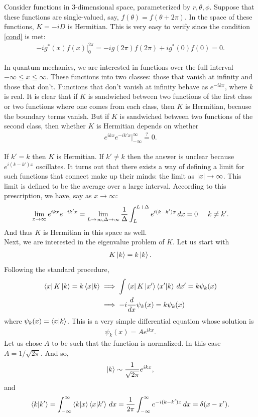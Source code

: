 \documentclass{book}
\theoremstyle{definition}
\newcommand{\f}[2]{\frac{#1}{#2}}
\begin{document}
Consider functions in 3-dimensional space, parameterized by $r,\theta,\phi$. Suppose that these functions are single-valued, say, $f(\theta) = f(\theta+2\pi)$. In the space of these functions, $K = -iD$ is Hermitian. This is very easy to verify since the condition \eqref{cond} is met:
\begin{align}
-ig^*(x)f(x)\big\vert_0^{2\pi} =-ig(2\pi)f(2\pi) + ig^*(0)f(0) = 0.
\end{align}

In quantum mechanics, we are interested in functions over the full interval $-\infty \leq x \leq \infty$. These functions into two classes: those that vanish at infinity and those that don't. Functions that don't vanish at infinity behave as $e^{-ikx}$, where $k$ is real. It is clear that if $K$ is sandwiched between two functions of the first class or two functions where one comes from each class, then $K$ is Hermitian, because the boundary terms vanish. But if $K$ is sandwiched between two functions of the second class, then whether $K$ is Hermitian depends on whether
\begin{align}
e^{ikx}e^{-ik'x}\bigg\vert_{-\infty}^\infty \stackrel{?}{=} 0.
\end{align}

If $k' = k$ then $K$ is Hermitian. If $k'\neq k$ then the answer is unclear because $e^{i(k-k')x}$ oscillates. It turns out that there exists a way of defining a limit for such functions that connect make up their minds: the limit as $\abs{x} \to \infty$. This limit is defined to be the average over a large interval. According to this prescription, we have, say as $x\to \infty$:
\begin{align}
\lim_{x\to\infty} e^{ikx}e^{-ik'x} = \lim_{L\to\infty, \Delta\to\infty}\f{1}{\Delta}\int^{L+\Delta}_L e^{i(k-k')x}\,dx = 0 \hspace{0.5cm} k\neq k'.
\end{align}
And thus $K$ is Hermitian in this space as well. \\

Next, we are interested in the eigenvalue problem of $K$. Let us start with
\begin{align}
K\ket{k} = k\ket{k}.
\end{align}
Following the standard procedure,
\begin{align}
\bra{x}K\ket{k} = k\braket{x}{k} &\implies \int \bra{x}K\ket{x'}\bra{x'}\ket{k}\,dx' = k\psi_k(x)\\ &\implies -i\f{d}{dx}\psi_k(x) = k\psi_k(x)
\end{align}
where $\psi_k(x) = \braket{x}{k}$. This is a very simple differential equation whose solution is
\begin{align}
\psi_k(x) = Ae^{ikx}.
\end{align}
Let us chose $A$ to be such that the function is normalized. In this case $A = 1/\sqrt{2\pi}$. And so,
\begin{align}
\ket{k} \sim \f{1}{\sqrt{2\pi}} e^{ikx},
\end{align}
and
\begin{align}
\braket{k}{k'} = \int^\infty_{-\infty} \braket{k}{x}\braket{x}{k'}\,dx = \f{1}{2\pi}\int^\infty_{-\infty}e^{-i(k-k')x}\,dx = \delta(x-x').
\end{align}
\end{document}
